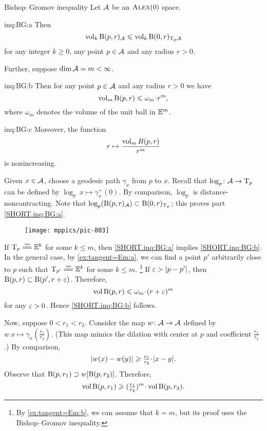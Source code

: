 \begin{thm}{Bishop--Gromov inequality}\label{inq:BG}
Let $\mathcal{A}$ be an $\textsc{Alex}(0)$ space.

\begin{subthm}{inq:BG:a}
Then
\[\operatorname{\rm vol}\nolimits_k \mathrm{B}{}(p,r)_{\mathcal{A}}\leqslant \operatorname{\rm vol}\nolimits_k \mathrm{B}{}(0,r)_{\mathrm{T}_p\mathcal{A}}\]
for any integer $k\ge 0$, any point $p\in \mathcal{A}$ and any radius $r>0$.
\end{subthm}

\smallskip

\noindent Further, suppose $\operatorname{\rm dim}\nolimits \mathcal{A}=m<\infty$.

\smallskip

\begin{subthm}{inq:BG:b}
Then for any point $p\in \mathcal{A}$ and any radius $r>0$ we have
\[\vol_m \oBall(p,r)\le \omega_m\cdot r^m,\]
where $\omega_m$ denotes the volume of the unit ball in $\mathbb{E}^m$.
\end{subthm}

\begin{subthm}{inq:BG:c}
Moreover, the function
\[r\mapsto \frac{\operatorname{\rm vol}\nolimits_m B(p,r)}{r^m}\]
is nonincreasing.
\end{subthm}

\end{thm}

Given $x\in\mathcal{A}$, choose a geodesic path $\gamma_x$ from $p$ to $x$.
Recall that $\log_p\colon\mathcal{A}\to \mathrm{T}_p$ can be defined by $\log_p\:x\mapsto \gamma_x^+(0)$.
By comparison, $\log_p$ is distance-noncontracting.
Note that $\log_p(\mathrm{B}{}(p,r)_{\mathcal{A}})\subset \mathrm{B}{}(0,r)_{\mathrm{T}_p}$;
this proves part \ref{SHORT.inq:BG:a}.

\begin{wrapfigure}{r}{44 mm}
\vskip-4mm
\centering
\texttt{[image: mppics/pic-803]}
\vskip1mm
\end{wrapfigure}

If $\T_p\iso \EE^k$ for some $k\le m$, then \ref{SHORT.inq:BG:a} implies \ref{SHORT.inq:BG:b}.
In the general case, by \ref{ex:tangent=Em:a}, we can find a point $p'$ arbitrarily close to $p$ such that $\T_{p'}\iso \EE^k$ for some $k\le m$.%
\footnote{By \ref{ex:tangent=Em:b}, we can assume that $k=m$, but its proof uses  the Bishop--Gromov inequality.}
If $\varepsilon>|{p}-{p'}|_{}^{{}}$, then $\mathrm{B}{}(p,r)\subset \mathrm{B}{}(p',r+\varepsilon)$.
Therefore,
\[\vol \oBall(p,r)\le \omega_m\cdot (r+\eps)^m\]
for any $\varepsilon>0$.
Hence \ref{SHORT.inq:BG:b} follows.

Now, suppose $0<r_1<r_2$.
Consider the map $w\colon \mathcal{A}\to \mathcal{A}$ defined by $w\:x\mapsto \gamma_x(\tfrac {r_1}{r_2})$.
(This map mimics the dilation with center at $p$ and coefficient $\tfrac {r_1}{r_2}$.)
By comparison,
\[\dist{w(x)}{w(y)}{}\ge \tfrac {r_1}{r_2}\cdot \dist{x}{y}{}.\]
Observe that $\mathrm{B}{}(p,r_1) \supset w[\mathrm{B}{}(p,r_2)]$.
Therefore, 
\[\vol \oBall(p,r_1)\ge (\tfrac {r_1}{r_2})^m\cdot\vol \oBall(p,r_2).\]
\qedsf

